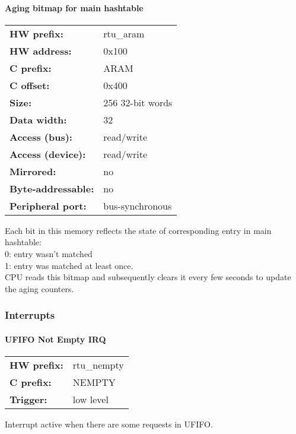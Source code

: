 \paragraph*{Aging bitmap for main hashtable}\vspace{12pt}

\begin{small}
\begin{tabular}{l l }
{\bf HW prefix:}  & rtu\_aram\\
{\bf HW address:}  & 0x100\\
{\bf C prefix:}  & ARAM\\
{\bf C offset:}  & 0x400\\
{\bf Size:}  & 256 32-bit words\\
{\bf Data width:}  & 32\\
{\bf Access (bus):}  & read/write\\
{\bf Access (device):}  & read/write\\
{\bf Mirrored:}  & no\\
{\bf Byte-addressable:}  & no\\
{\bf Peripheral port:}  & bus-synchronous\\
\end{tabular}

\end{small}
Each bit in this memory reflects the state of corresponding entry in main hashtable:\\                    0: entry wasn't matched\\                    1: entry was matched at least once.\\                    CPU reads this bitmap and subsequently clears it every few seconds to update the aging counters.

\subsubsection{Interrupts}
\paragraph*{UFIFO Not Empty IRQ}\vspace{12pt}
\begin{small}
\begin{tabular}{l l }
{\bf HW prefix:}  & rtu\_nempty\\
{\bf C prefix:}  & NEMPTY\\
{\bf Trigger:}  & low level\\
\end{tabular}

\end{small}
\vspace{12pt}
Interrupt active when there are some requests in UFIFO.

